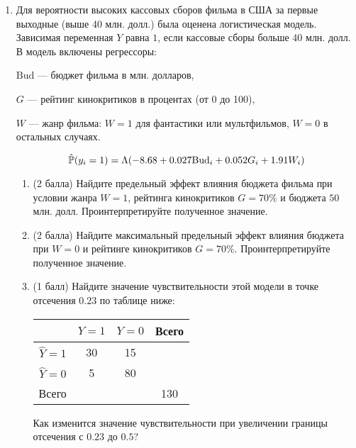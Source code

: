 \begin{enumerate}
\begin{enumerate}
    \end{enumerate}

    \item 
Для вероятности высоких кассовых сборов фильма в США за первые выходные (выше 40 млн. долл.) была оценена логистическая модель. Зависимая переменная  $Y$ равна $1$, если кассовые сборы больше 40 млн. долл. В модель включены регрессоры: 

$\text{Bud}$ — бюджет фильма в млн. долларов, 

$G$ — рейтинг кинокритиков в процентах (от 0 до 100), 

$W$ — жанр фильма: $W=1$ для фантастики или мультфильмов, $W=0$ в остальных случаях.

\[
\hat \P(y_i = 1) = \Lambda(-8.68 + 0.027 \text{Bud}_i + 0.052 G_i + 1.91 W_i)    
\]

\begin{enumerate}
\item (2 балла) Найдите предельный  эффект влияния бюджета фильма при условии жанра $W=1$, рейтинга кинокритиков $G = 70\%$ и бюджета $50$ млн. долл. Проинтерпретируйте полученное значение. 

\item (2 балла) Найдите максимальный предельный эффект влияния бюджета при $W=0$ и рейтинге кинокритиков $G=70\%$. Проинтерпретируйте полученное значение. 

\item (1 балл) Найдите значение чувствительности этой модели в точке отсечения $0.23$ по таблице ниже:

\begin{tabular}{@{}cccc@{}}
\toprule
           & $Y=1$ & $Y=0$ & Всего\\ \midrule
$\hat Y=1$ & 30 & 15 &  \\
$\hat Y=0$ & 5 & 80 &  \\
Всего &  &  & 130   \\ \bottomrule
\end{tabular}

Как изменится значение чувствительности при увеличении границы отсечения с $0.23$ до $0.5$? 
\end{enumerate}



\end{enumerate}
